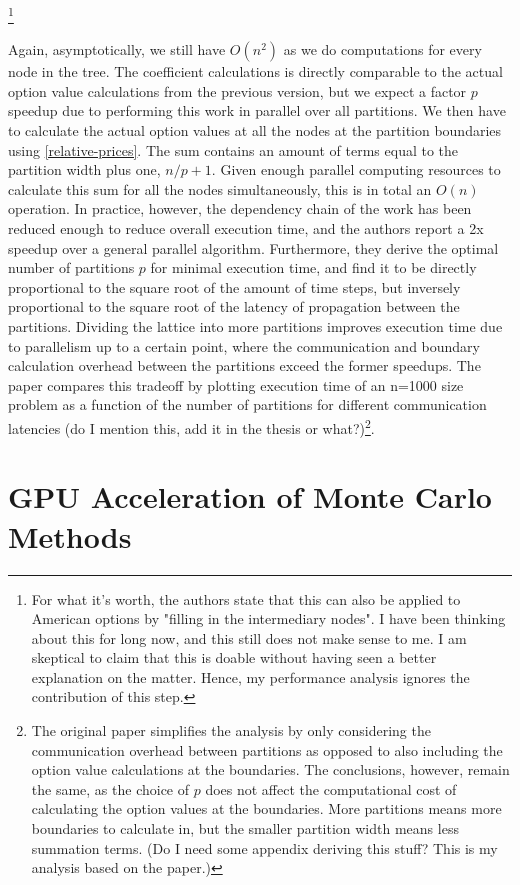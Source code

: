 \documentclass[english,12pt,a4paper,pdftex,sci,utf8]{aaltothesis}
\begin{document}
\footnote{For what it's worth, the authors state that this can also be applied to American options by "filling in the intermediary nodes". I have been thinking about this for long now, and this still does not make sense to me. I am skeptical to claim that this is doable without having seen a better explanation on the matter. Hence, my performance analysis ignores the contribution of this step.}

Again, asymptotically, we still have $O(n^2)$ as we do computations for every node in the tree. The coefficient calculations is directly comparable to the actual option value calculations from the previous version, but we expect a factor $p$ speedup due to performing this work in parallel over all partitions. We then have to calculate the actual option values at all the nodes at the partition boundaries using \eqref{relative-prices}. The sum contains an amount of terms equal to the partition width plus one, $n/p+1$. Given enough parallel computing resources to calculate this sum for all the nodes simultaneously, this is in total an $O(n)$ operation. In practice, however, the dependency chain of the work has been reduced enough to reduce overall execution time, and the authors report a 2x speedup over a general parallel algorithm. Furthermore, they derive the optimal number of partitions $p$ for minimal execution time, and find it to be directly proportional to the square root of the amount of time steps, but inversely proportional to the square root of the latency of propagation between the partitions. Dividing the lattice into more partitions improves execution time due to parallelism up to a certain point, where the communication and boundary calculation overhead between the partitions exceed the former speedups. The paper compares this tradeoff by plotting execution time of an n=1000 size problem as a function of the number of partitions for different communication latencies (do I mention this, add it in the thesis or what?)\footnote{The original paper simplifies the analysis by only considering the communication overhead between partitions as opposed to also including the option value calculations at the boundaries. The conclusions, however, remain the same, as the choice of $p$ does not affect the computational cost of calculating the option values at the boundaries. More partitions means more boundaries to calculate in, but the smaller partition width means less summation terms. (Do I need some appendix deriving this stuff? This is my analysis based on the paper.)}.


\section{GPU Acceleration of Monte Carlo Methods} \label{sec:gpu-mc}
\end{document}
